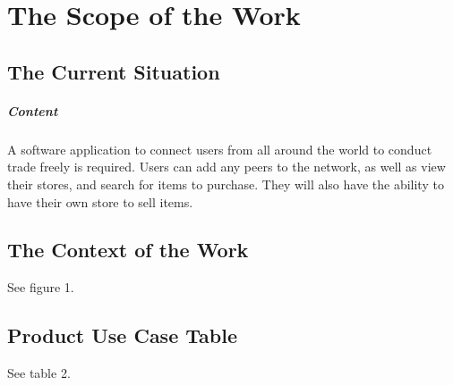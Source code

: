 \documentclass{article}
\begin{document}
\section{The Scope of the Work}
\subsection{The Current Situation}
\subparagraph{Content}
A software application to connect users from all around the world to conduct trade freely is required. Users can add any peers to the network, as well as view their stores, and search for items to purchase. They will also have the ability to have their own store to sell items.
\subsection{The Context of the Work}
See figure 1.
\subsection{Product Use Case Table}
See table 2.
\end{document}
